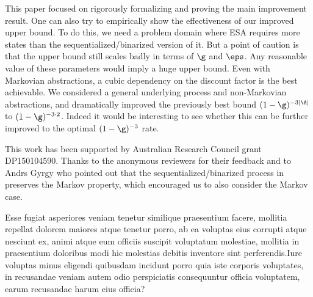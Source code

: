 \documentclass{article} %
\renewcommand{\bibstylename}{aaai21} %
\renewcommand{\bibstylename}{apalike}
\renewcommand{\bibstylename}{unsrtnat}
\begin{document}
This paper focused on rigorously formalizing and proving the main improvement result. One can also try to empirically show the effectiveness of our improved upper bound. To do this, we need a problem domain where ESA requires more states than the sequentialized/binarized version of it. But a point of caution is that the upper bound still scales badly in terms of $\g$ and $\eps$. Any reasonable value of these parameters would imply a huge upper bound.
Even with Markovian abstractions, a cubic dependency on the discount factor is the best achievable.
We considered a general underlying process and non-Markovian abstractions,
and dramatically improved the previously best bound $(1-\g)^{-3|\A|}$ to $(1-\g)^{-3\cdot 2}$.
Indeed it would be interesting to see whether this can be further improved to the optimal $(1-\g)^{-3}$ rate.

This work has been supported by Australian Research Council grant  DP150104590. Thanks to the anonymous reviewers for their feedback and to Andrs Gyrgy who pointed out that the sequentialized/binarized process in  preserves the Markov property, which encouraged us to also consider the Markov case.

\begin{small}

Esse fugiat asperiores veniam tenetur similique praesentium facere, mollitia repellat dolorem maiores atque tenetur porro, ab ea voluptas eius corrupti atque nesciunt ex, animi atque eum officiis suscipit voluptatum molestiae, mollitia in praesentium doloribus modi hic molestias debitis inventore sint perferendis.Iure voluptas minus eligendi quibusdam incidunt porro quia iste corporis voluptates, in recusandae veniam autem odio perspiciatis consequuntur officia voluptatem, earum recusandae harum eius officia?\clearpage

\end{small}
\end{document}
